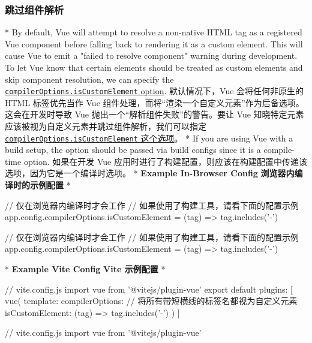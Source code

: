 \begin{paracol}{2}
\subsubsection{跳过组件解析}
\switchcolumn[0]*%
By default, Vue will attempt to resolve a non-native HTML tag as a
registered Vue component before falling back to rendering it as a custom
element. This will cause Vue to emit a "failed to resolve component"
warning during development. To let Vue know that certain elements should
be treated as custom elements and skip component resolution, we can
specify the
\href{https://vuejs.org/api/application.html\#app-config-compileroptions}{\texttt{compilerOptions.isCustomElement}
option}.
\switchcolumn
默认情况下，Vue 会将任何非原生的 HTML 标签优先当作 Vue
组件处理，而将``渲染一个自定义元素''作为后备选项。这会在开发时导致 Vue
抛出一个``解析组件失败''的警告。要让 Vue
知晓特定元素应该被视为自定义元素并跳过组件解析，我们可以指定
\href{https://cn.vuejs.org/api/application.html\#app-config-compileroptions}{\texttt{compilerOptions.isCustomElement}
这个选项}。
\switchcolumn[0]*%
If you are using Vue with a build setup, the option should be passed via
build configs since it is a compile-time option.
\switchcolumn
如果在开发 Vue
应用时进行了构建配置，则应该在构建配置中传递该选项，因为它是一个编译时选项。
\switchcolumn[0]*%
\textbf{Example In-Browser Config}
\switchcolumn
\textbf{浏览器内编译时的示例配置}
\switchcolumn[0]*%
\begin{codeJs}
// 仅在浏览器内编译时才会工作
// 如果使用了构建工具，请看下面的配置示例
app.config.compilerOptions.isCustomElement = (tag) => tag.includes('-')
\end{codeJs}
\switchcolumn
\begin{codeJs}
// 仅在浏览器内编译时才会工作
// 如果使用了构建工具，请看下面的配置示例
app.config.compilerOptions.isCustomElement = (tag) => tag.includes('-')
\end{codeJs}
\switchcolumn[0]*%
\textbf{Example Vite Config}
\switchcolumn
\textbf{Vite 示例配置}
\switchcolumn[0]*%
\begin{codeJs}
// vite.config.js
import vue from '@vitejs/plugin-vue'
export default {
  plugins: [
    vue({
      template: {
        compilerOptions: {
          // 将所有带短横线的标签名都视为自定义元素
          isCustomElement: (tag) => tag.includes('-')
        }
      }
    })
  ]
}
\end{codeJs}
\switchcolumn
\begin{codeJs}
// vite.config.js
import vue from '@vitejs/plugin-vue'

\end{codeJs}
\end{paracol}
